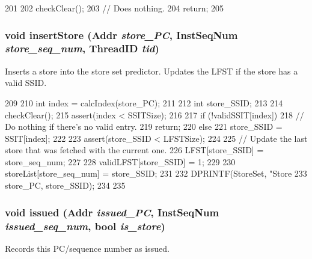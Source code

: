 \begin{DoxyCode}
201 {
202     checkClear();
203     // Does nothing.
204     return;
205 }
\end{DoxyCode}
\hypertarget{classStoreSet_ab879063d4bfe2e1c91025715007bfecb}{
\subsubsection[{insertStore}]{\setlength{\rightskip}{0pt plus 5cm}void insertStore ({\bf Addr} {\em store\_\-PC}, \/  {\bf InstSeqNum} {\em store\_\-seq\_\-num}, \/  {\bf ThreadID} {\em tid})}}
\label{classStoreSet_ab879063d4bfe2e1c91025715007bfecb}
Inserts a store into the store set predictor. Updates the LFST if the store has a valid SSID. 


\begin{DoxyCode}
209 {
210     int index = calcIndex(store_PC);
211 
212     int store_SSID;
213 
214     checkClear();
215     assert(index < SSITSize);
216 
217     if (!validSSIT[index]) {
218         // Do nothing if there's no valid entry.
219         return;
220     } else {
221         store_SSID = SSIT[index];
222 
223         assert(store_SSID < LFSTSize);
224 
225         // Update the last store that was fetched with the current one.
226         LFST[store_SSID] = store_seq_num;
227 
228         validLFST[store_SSID] = 1;
229 
230         storeList[store_seq_num] = store_SSID;
231 
232         DPRINTF(StoreSet, "Store %
233                 store_PC, store_SSID);
234     }
235 }
\end{DoxyCode}
\hypertarget{classStoreSet_a2c9204930bc1f40dfe7451a29a6b8d8d}{
\subsubsection[{issued}]{\setlength{\rightskip}{0pt plus 5cm}void issued ({\bf Addr} {\em issued\_\-PC}, \/  {\bf InstSeqNum} {\em issued\_\-seq\_\-num}, \/  bool {\em is\_\-store})}}
\label{classStoreSet_a2c9204930bc1f40dfe7451a29a6b8d8d}
Records this PC/sequence number as issued. 


